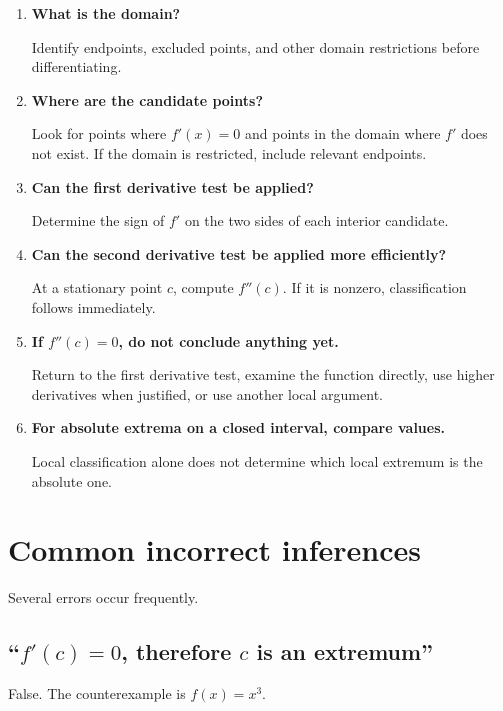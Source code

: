 \documentclass{essay}
\begin{document}
\begin{enumerate}
    \item \textbf{What is the domain?}

    Identify endpoints, excluded points, and other domain restrictions before differentiating.

    \item \textbf{Where are the candidate points?}

    Look for points where \(f'(x)=0\) and points in the domain where \(f'\) does not exist. If the domain is restricted, include relevant endpoints.

    \item \textbf{Can the first derivative test be applied?}

    Determine the sign of \(f'\) on the two sides of each interior candidate.

    \item \textbf{Can the second derivative test be applied more efficiently?}

    At a stationary point \(c\), compute \(f''(c)\). If it is nonzero, classification follows immediately.

    \item \textbf{If \(f''(c)=0\), do not conclude anything yet.}

    Return to the first derivative test, examine the function directly, use higher derivatives when justified, or use another local argument.

    \item \textbf{For absolute extrema on a closed interval, compare values.}

    Local classification alone does not determine which local extremum is the absolute one.
\end{enumerate}

\section{Common incorrect inferences}

Several errors occur frequently.

\subsection{\texorpdfstring{``\(f'(c)=0\), therefore \(c\) is an extremum''}{``f'(c)=0, therefore c is an extremum''}}

False. The counterexample is \(f(x)=x^3\).
\end{document}

